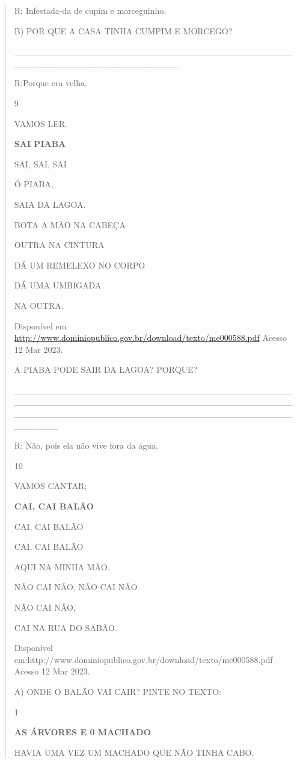 {{{{\begin{verse}
{{\begin{escolha}
{{{{{R: Infestada-da de cupim e morceguinho.

B) POR QUE A CASA TINHA CUMPIM E MORCEGO?

\_\_\_\_\_\_\_\_\_\_\_\_\_\_\_\_\_\_\_\_\_\_\_\_\_\_\_\_\_\_\_\_\_\_\_\_\_\_\_\_\_\_\_\_\_\_\_\_\_\_\_\_\_\_\_\_\_\_\_\_\_\_\_\_\_\_\_\_\_\_

R:Porque era velha.

\num{9}

VAMOS LER.

\textbf{SAI PIABA}

SAI, SAI, SAI

Ó PIABA,

SAIA DA LAGOA.

BOTA A MÃO NA CABEÇA

OUTRA NA CINTURA

DÁ UM REMELEXO NO CORPO

DÁ UMA UMBIGADA

NA OUTRA.

Disponível em
\url{http://www.dominiopublico.gov.br/download/texto/me000588.pdf}
Acesso 12 Mar 2023.

A PIABA PODE SAIR DA LAGOA? PORQUE?

\_\_\_\_\_\_\_\_\_\_\_\_\_\_\_\_\_\_\_\_\_\_\_\_\_\_\_\_\_\_\_\_\_\_\_\_\_\_\_\_\_\_\_\_\_\_\_\_\_\_\_\_\_\_\_\_\_\_\_\_\_\_\_\_\_\_\_\_\_\_\_\_\_\_\_\_\_\_\_\_\_\_\_\_\_\_\_\_\_\_\_\_\_\_\_\_\_\_\_\_\_\_\_\_\_\_\_\_\_\_\_\_\_\_\_\_\_\_\_\_\_\_\_\_\_\_\_\_\_\_\_\_\_\_\_\_\_\_\_

R: Não, pois ela não vive fora da água.

\num{10}

VAMOS CANTAR;

\textbf{CAI, CAI BALÃO}

CAI, CAI BALÃO

CAI, CAI BALÃO

AQUI NA MINHA MÃO.

NÃO CAI NÃO, NÃO CAI NÃO

NÃO CAI NÃO,

CAI NA RUA DO SABÃO.

Disponível
em:http://www.dominiopublico.gov.br/download/texto/me000588.pdf Acesso
12 Mar 2023.

A) ONDE O BALÃO VAI CAIR? PINTE NO TEXTO:


\num{1}

\textbf{AS ÁRVORES E 0 MACHADO}

HAVIA UMA VEZ UM MACHADO QUE NÃO TINHA CABO.

}}}}}
\end{escolha}}}
\end{verse}}}}}
